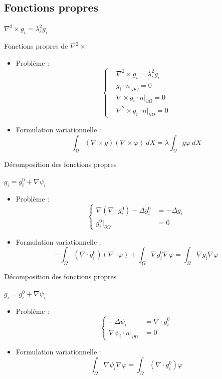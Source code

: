 \documentclass{beamer}
\newcommand{\grad}{{\nabla}}
\newcommand{\laplace}{{\Delta}}
\newcommand{\rot}{{\nabla\times}}
\newcommand{\rott}{{\nabla^2\times}}
\newcommand{\diverg}{{\nabla\cdot}}
\newcommand{\restr}{{\big\rvert_{\partial\Omega}}}
\begin{document}
\subsection{Fonctions propres}
\begin{frame}{$\rott  g_i = \lambda_i^2 g_i$}
\begin{block}{Fonctions propres de $\rott$}
\begin{itemize}
\item Problème :
\[
\left\{
\begin{aligned}
&\rott  g_i = \lambda_i^2 g_i\\
&g_i\cdot n\restr = 0\\
&\rot g_i\cdot n\restr = 0\\
&\rott  g_i\cdot n\restr = 0
\end{aligned}
\right.
\]
\item Formulation variationnelle :
\[
\int_\Omega (\rot g)(\rot\varphi)\ dX = \lambda\int_\Omega g\varphi\ dX
\]
\end{itemize}
\end{block}
\end{frame}

\begin{frame}{Décomposition des fonctions propres}
\begin{block}{$g_i=g_i^0+\grad\psi_i$}
\begin{itemize}
\item Problème :
\[
\left\{
\begin{aligned}
\grad(\diverg g_i^0)-\laplace g_i^0 &= -\laplace g_i\\
g_i^0\restr &= 0
\end{aligned}
\right.
\]
\item Formulation variationnelle :
\[
-\int_\Omega (\diverg g_i^0)(\diverg\varphi) + \int_\Omega \grad g_i^0\grad\varphi = \int_\Omega \grad g_i\grad\varphi
\]
\end{itemize}
\end{block}
\end{frame}

\begin{frame}{Décomposition des fonctions propres}
\begin{block}{$g_i=g_i^0+\grad\psi_i$}
\begin{itemize}
\item Problème :
\[
\left\{
\begin{aligned}
-\laplace\psi_i &= \diverg g_i^0\\
\grad\psi_i\cdot n\restr &= 0
\end{aligned}
\right.
\]
\item Formulation variationnelle :
\[
\int_\Omega \grad\psi_i\grad\varphi = \int_\Omega (\diverg g_i^0)\varphi
\]
\end{itemize}
\end{block}
\end{frame}
\end{document}
